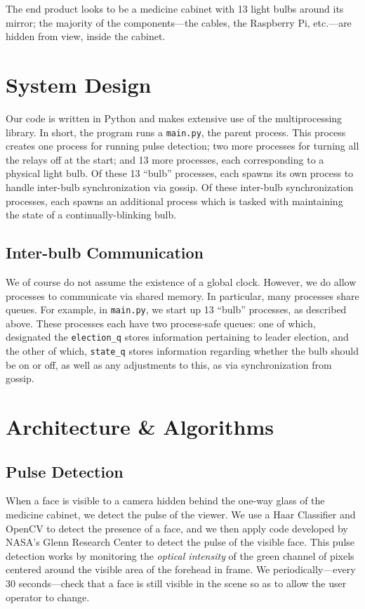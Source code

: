 \documentclass[preprint,review,12pt]{cs262}
\begin{document}
The end product looks to be a medicine cabinet with 13 light bulbs around its mirror; the majority of the components---the cables, the Raspberry Pi, etc.---are hidden from view, inside the cabinet. 

\section{System Design}


Our code is written in Python and makes extensive use of the multiprocessing library. In short, the program runs a \texttt{main.py}, the parent process. This process creates one process for running pulse detection; two more processes for turning all the relays off at the start; and 13 more processes, each corresponding to a physical light bulb. Of these 13 ``bulb'' processes, each spawns its own process to handle inter-bulb synchronization via gossip. Of these inter-bulb synchronization processes, each spawns an additional process which is tasked with maintaining the state of a continually-blinking bulb. 

\subsection{Inter-bulb Communication}

We of course do not assume the existence of a global clock. However, we do allow processes to communicate via shared memory. In particular, many processes share queues.  For example, in  \texttt{main.py}, we start up 13 ``bulb'' processes, as described above. These processes each have two process-safe queues: one of which, designated the \texttt{election\_q} stores information pertaining to leader election, and the other of which, \texttt{state\_q} stores information regarding whether the bulb should be on or off, as well as any adjustments to this, as via synchronization from gossip. 

\section{Architecture \& Algorithms}

\subsection{Pulse Detection} 

When a face is visible to a camera hidden behind the one-way glass of the medicine cabinet, we detect the pulse of the viewer. We use a Haar Classifier and OpenCV to detect the presence of a face, and we then apply code developed by NASA's Glenn Research Center\cite{NASA} to detect the pulse of the visible face. This pulse detection works by monitoring the \emph{optical intensity} of the green channel of pixels centered around the visible area of the forehead in frame. We periodically---every 30 seconds---check that a face is still visible in the scene so as to allow the user operator to change. 
\end{document}
